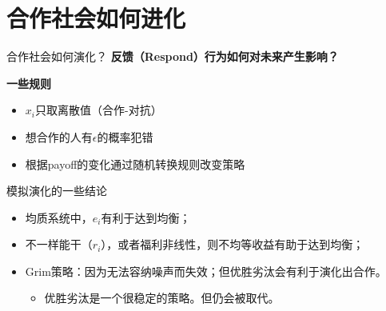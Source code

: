 \documentclass{beamer}
\begin{document}
\section{合作社会如何进化}
\begin{frame}{合作社会如何演化？}
    \textbf{反馈（Respond）行为如何对未来产生影响？}

    \vspace{0.5cm}
    \textbf{一些规则}
    \begin{itemize}
        \item $x_i$只取离散值（合作-对抗）
        \item 想合作的人有$\epsilon$的概率犯错
        \item 根据payoff的变化通过随机转换规则改变策略
        
    \end{itemize}
\end{frame}
\begin{frame}{模拟演化的一些结论}
    \begin{itemize}
        \item 均质系统中，$e_i$有利于达到均衡；
        \item 不一样能干（$r_i$），或者福利非线性，则不均等收益有助于达到均衡；
        \item Grim策略：因为无法容纳噪声而失效；但优胜劣汰会有利于演化出合作。
        \begin{itemize}
            \item 优胜劣汰是一个很稳定的策略。但仍会被取代。
        \end{itemize}
    \end{itemize}
\end{frame}
\end{document}
